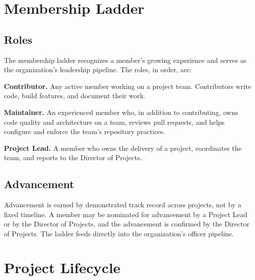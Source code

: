 \documentclass[12pt,letterpaper]{article} %
\begin{document}
\section{Membership Ladder}\label{art:ladder}
\subsection{Roles}\label{sec:ladder-roles}
The membership ladder recognizes a member's growing experience and serves as the organization's
leadership pipeline. The roles, in order, are:
\begin{alphalist}
  \item \textbf{Contributor.} Any active member working on a project team. Contributors write
  code, build features, and document their work.
  \item \textbf{Maintainer.} An experienced member who, in addition to contributing, owns code
  quality and architecture on a team, reviews pull requests, and helps configure and enforce
  the team's repository practices.
  \item \textbf{Project Lead.} A member who owns the delivery of a project, coordinates the
  team, and reports to the Director of Projects.
\end{alphalist}
\subsection{Advancement}\label{sec:ladder-advancement}
Advancement is earned by demonstrated track record across projects, not by a fixed timeline. A
member may be nominated for advancement by a Project Lead or by the Director of Projects, and
the advancement is confirmed by the Director of Projects. The ladder feeds directly into the
organization's officer pipeline.

\section{Project Lifecycle}\label{art:lifecycle}
\end{document}
